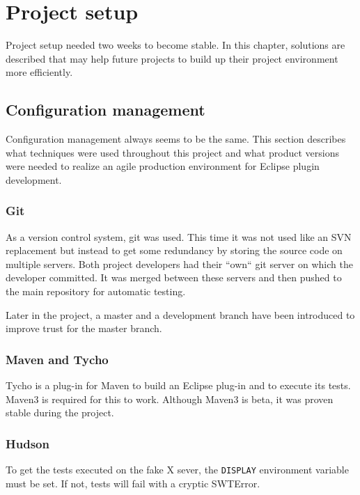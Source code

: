\chapter{Project setup}
\thispagestyle{fancy}

Project setup needed two weeks to become stable. In this chapter, solutions are 
described that may help future projects to build up their project environment 
more efficiently.

\section{Configuration management}

Configuration management always seems to be the same. This section describes 
what techniques were used throughout this project and what product versions were 
needed to realize an agile production environment for Eclipse plugin development.

\subsection{Git}

As a version control system, git was used. This time it was not used like an SVN
replacement but instead to get some redundancy by storing the source code on
multiple servers. Both project developers had their ``own`` git server on which
the developer committed. It was merged between these servers and then pushed to
the main repository for automatic testing.

Later in the project, a master and a development branch have been introduced to 
improve trust for the master branch.

\subsection{Maven and Tycho}

Tycho is a plug-in for Maven to build an Eclipse plug-in and to execute its tests.
Maven3 is required for this to work. Although Maven3 is beta, it was proven
stable during the project.

\subsection{Hudson}

To get the tests executed on the fake X sever, the \texttt{DISPLAY} environment
variable must be set. If not, tests will fail with a cryptic
SWTError.

